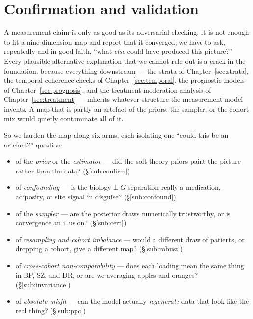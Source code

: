 \section{Confirmation and validation}
\label{sec:validation}

A measurement claim is only as good as its adversarial checking. It is not enough to fit a nine-dimension map
and report that it converged; we have to ask, repeatedly and in good faith, ``what \emph{else} could have
produced this picture?'' Every plausible alternative explanation that we cannot rule out is a crack in the
foundation, because everything downstream --- the strata of Chapter~\ref{sec:strata}, the temporal-coherence
checks of Chapter~\ref{sec:temporal}, the prognostic models of Chapter~\ref{sec:prognosis}, and the
treatment-moderation analysis of Chapter~\ref{sec:treatment} --- inherits whatever structure the measurement
model invents. A map that is partly an artefact of the priors, the sampler, or the cohort mix would quietly
contaminate all of it.

So we harden the map along six arms, each isolating one ``could this be an artefact?'' question:

\begin{itemize}\setlength{\itemsep}{2pt}
  \item of the \emph{prior} or the \emph{estimator} --- did the soft theory priors paint the picture rather
  than the data? (§\ref{sub:confirm})
  \item of \emph{confounding} --- is the biology$\perp$$G$ separation really a medication, adiposity, or site
  signal in disguise? (§\ref{sub:confound})
  \item of the \emph{sampler} --- are the posterior draws numerically trustworthy, or is convergence an
  illusion? (§\ref{sub:cert})
  \item of \emph{resampling and cohort imbalance} --- would a different draw of patients, or dropping a
  cohort, give a different map? (§\ref{sub:robust})
  \item of \emph{cross-cohort non-comparability} --- does each loading mean the same thing in BP, SZ, and DR,
  or are we averaging apples and oranges? (§\ref{sub:invariance})
  \item of \emph{absolute misfit} --- can the model actually \emph{regenerate} data that look like the real
  thing? (§\ref{sub:ppc})
\end{itemize}

